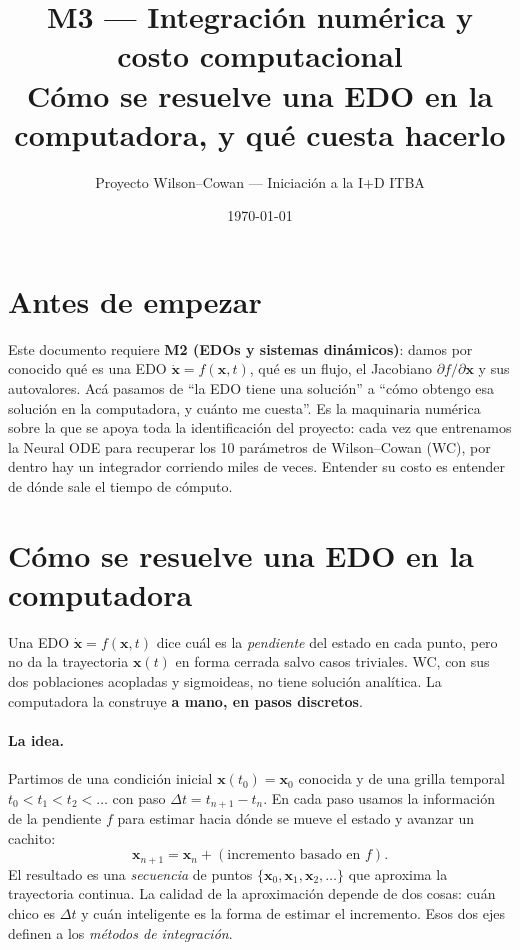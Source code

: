 \documentclass[11pt,a4paper]{article}
\title{\textbf{M3 --- Integración numérica y costo computacional}\\[2pt]\large Cómo se resuelve una EDO en la computadora, y qué cuesta hacerlo}
\author{Proyecto Wilson--Cowan --- Iniciación a la I+D ITBA}
\date{\today}
\begin{document}
\maketitle
\tableofcontents
\bigskip

\section*{Antes de empezar}
Este documento requiere \textbf{M2 (EDOs y sistemas dinámicos)}: damos por conocido qué es una EDO $\dot{\mathbf{x}}=f(\mathbf{x},t)$, qué es un flujo, el Jacobiano $\partial f/\partial\mathbf{x}$ y sus autovalores. Acá pasamos de ``la EDO tiene una solución'' a ``cómo obtengo esa solución en la computadora, y cuánto me cuesta''. Es la maquinaria numérica sobre la que se apoya toda la identificación del proyecto: cada vez que entrenamos la Neural ODE para recuperar los 10 parámetros de Wilson--Cowan (WC), por dentro hay un integrador corriendo miles de veces. Entender su costo es entender de dónde sale el tiempo de cómputo.

\section{Cómo se resuelve una EDO en la computadora}
\label{sec:pasos}
Una EDO $\dot{\mathbf{x}}=f(\mathbf{x},t)$ dice cuál es la \emph{pendiente} del estado en cada punto, pero no da la trayectoria $\mathbf{x}(t)$ en forma cerrada salvo casos triviales. WC, con sus dos poblaciones acopladas y sigmoideas, no tiene solución analítica. La computadora la construye \textbf{a mano, en pasos discretos}.

\paragraph{La idea.} Partimos de una condición inicial $\mathbf{x}(t_0)=\mathbf{x}_0$ conocida y de una grilla temporal $t_0<t_1<t_2<\dots$ con paso $\Delta t=t_{n+1}-t_n$. En cada paso usamos la información de la pendiente $f$ para estimar hacia dónde se mueve el estado y avanzar un cachito:
\begin{equation}
  \mathbf{x}_{n+1}=\mathbf{x}_n + (\text{incremento basado en } f).
\end{equation}
El resultado es una \emph{secuencia} de puntos $\{\mathbf{x}_0,\mathbf{x}_1,\mathbf{x}_2,\dots\}$ que aproxima la trayectoria continua. La calidad de la aproximación depende de dos cosas: cuán chico es $\Delta t$ y cuán inteligente es la forma de estimar el incremento. Esos dos ejes definen a los \emph{métodos de integración}.
\end{document}
